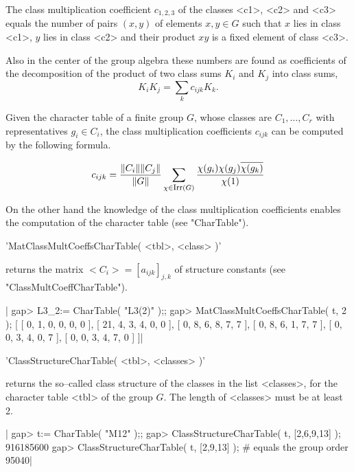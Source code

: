The class  multiplication coefficient  $c_{1,2,3}$ of  the classes  <c1>,
<c2> and <c3> equals the number of pairs $(x,y)$ of elements $x, y \in G$
such  that  $x$ lies  in class <c1>, $y$ lies  in  class  <c2>  and their
product $xy$ is a fixed element of class <c3>.

Also  in  the  center of  the group  algebra  these  numbers are found as
coefficients of the decomposition of the product  of two class sums $K_i$
and $K_j$ into class sums, \[ K_i K_j = \sum_k c_{ijk} K_k. \]

Given the character table of a finite group $G$, whose classes  are $C_1,
\dots, C_r$ with representatives $g_i \in C_i$,  the class multiplication
coefficients $c_{ijk}$ can be computed by the following formula.

\[c_{ijk} = \frac{\|C_i\|\|C_j\|}{\|G\|}
             \sum_{\chi \in \mbox{\footnotesize Irr}(G)}
             \frac{\chi(g_i) \chi(g_j) \overline{\chi(g_k)}}{\chi(1)} \]

On the other hand the knowledge of the class multiplication  coefficients
enables the computation of the character table (see "CharTable").

%
%

'MatClassMultCoeffsCharTable( <tbl>, <class> )'

returns the matrix $<C_i> = [ a_{ijk}]_{j,k}$ of structure constants
(see "ClassMultCoeffCharTable").

|    gap> L3_2:= CharTable( "L3(2)" );;
    gap> MatClassMultCoeffsCharTable( t, 2 );
    [ [ 0, 1, 0, 0, 0, 0 ], [ 21, 4, 3, 4, 0, 0 ], [ 0, 8, 6, 8, 7, 7 ],
      [ 0, 8, 6, 1, 7, 7 ], [ 0, 0, 3, 4, 0, 7 ], [ 0, 0, 3, 4, 7, 0 ] ]|

%
%

'ClassStructureCharTable( <tbl>, <classes> )'

returns the so--called class structure of the classes in the list
<classes>, for the character table <tbl> of the group $G$.
The length of <classes> must be at least 2.

|    gap> t:= CharTable( "M12" );;
    gap> ClassStructureCharTable( t, [2,6,9,13] );
    916185600
    gap> ClassStructureCharTable( t, [2,9,13] ); # equals the group order
    95040|

